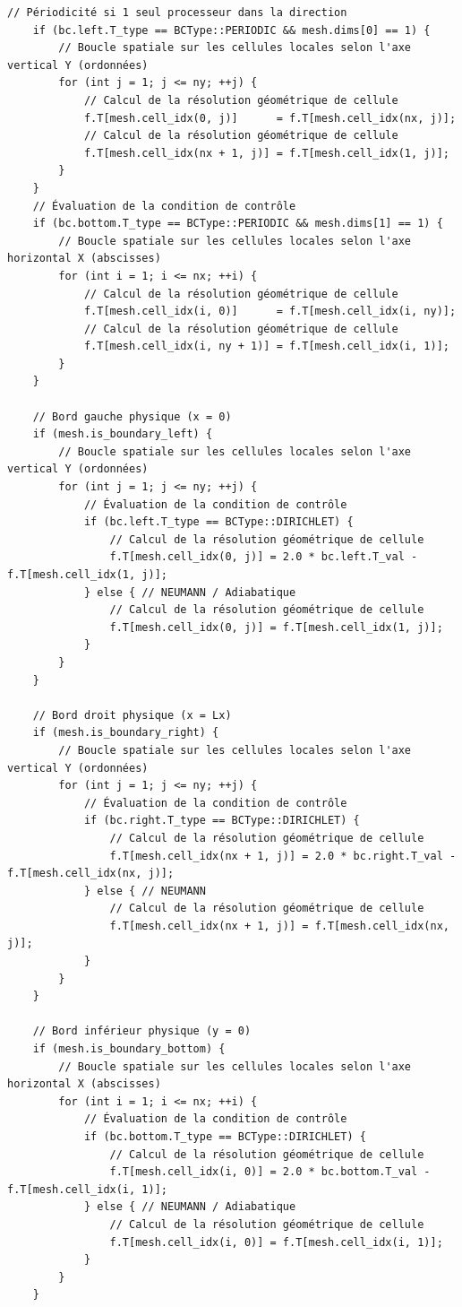 \documentclass[10pt,a4paper,oneside]{book}
\begin{document}
\begin{lstlisting}[language={[11]C++}]
    // Périodicité si 1 seul processeur dans la direction
    if (bc.left.T_type == BCType::PERIODIC && mesh.dims[0] == 1) {
        // Boucle spatiale sur les cellules locales selon l'axe vertical Y (ordonnées)
        for (int j = 1; j <= ny; ++j) {
            // Calcul de la résolution géométrique de cellule
            f.T[mesh.cell_idx(0, j)]      = f.T[mesh.cell_idx(nx, j)];
            // Calcul de la résolution géométrique de cellule
            f.T[mesh.cell_idx(nx + 1, j)] = f.T[mesh.cell_idx(1, j)];
        }
    }
    // Évaluation de la condition de contrôle
    if (bc.bottom.T_type == BCType::PERIODIC && mesh.dims[1] == 1) {
        // Boucle spatiale sur les cellules locales selon l'axe horizontal X (abscisses)
        for (int i = 1; i <= nx; ++i) {
            // Calcul de la résolution géométrique de cellule
            f.T[mesh.cell_idx(i, 0)]      = f.T[mesh.cell_idx(i, ny)];
            // Calcul de la résolution géométrique de cellule
            f.T[mesh.cell_idx(i, ny + 1)] = f.T[mesh.cell_idx(i, 1)];
        }
    }

    // Bord gauche physique (x = 0)
    if (mesh.is_boundary_left) {
        // Boucle spatiale sur les cellules locales selon l'axe vertical Y (ordonnées)
        for (int j = 1; j <= ny; ++j) {
            // Évaluation de la condition de contrôle
            if (bc.left.T_type == BCType::DIRICHLET) {
                // Calcul de la résolution géométrique de cellule
                f.T[mesh.cell_idx(0, j)] = 2.0 * bc.left.T_val - f.T[mesh.cell_idx(1, j)];
            } else { // NEUMANN / Adiabatique
                // Calcul de la résolution géométrique de cellule
                f.T[mesh.cell_idx(0, j)] = f.T[mesh.cell_idx(1, j)];
            }
        }
    }

    // Bord droit physique (x = Lx)
    if (mesh.is_boundary_right) {
        // Boucle spatiale sur les cellules locales selon l'axe vertical Y (ordonnées)
        for (int j = 1; j <= ny; ++j) {
            // Évaluation de la condition de contrôle
            if (bc.right.T_type == BCType::DIRICHLET) {
                // Calcul de la résolution géométrique de cellule
                f.T[mesh.cell_idx(nx + 1, j)] = 2.0 * bc.right.T_val - f.T[mesh.cell_idx(nx, j)];
            } else { // NEUMANN
                // Calcul de la résolution géométrique de cellule
                f.T[mesh.cell_idx(nx + 1, j)] = f.T[mesh.cell_idx(nx, j)];
            }
        }
    }

    // Bord inférieur physique (y = 0)
    if (mesh.is_boundary_bottom) {
        // Boucle spatiale sur les cellules locales selon l'axe horizontal X (abscisses)
        for (int i = 1; i <= nx; ++i) {
            // Évaluation de la condition de contrôle
            if (bc.bottom.T_type == BCType::DIRICHLET) {
                // Calcul de la résolution géométrique de cellule
                f.T[mesh.cell_idx(i, 0)] = 2.0 * bc.bottom.T_val - f.T[mesh.cell_idx(i, 1)];
            } else { // NEUMANN / Adiabatique
                // Calcul de la résolution géométrique de cellule
                f.T[mesh.cell_idx(i, 0)] = f.T[mesh.cell_idx(i, 1)];
            }
        }
    }


\end{lstlisting}
\end{document}
